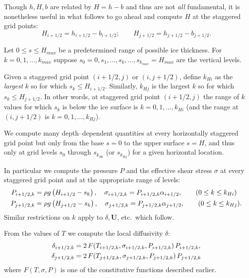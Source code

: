 \documentclass[12pt,final]{amsart}%
\theoremstyle{plain}
\theoremstyle{definition}
\theoremstyle{remark}
\newcommand{\bU}{{\mathbf{U}}}
\begin{document}
Though $h,H,b$ are related by $H=h-b$ and thus are not \emph{all} fundamental, it is nonetheless useful in what follows to go ahead and compute $H$ at the staggered grid points:
\begin{equation}
    H_{i+1/2}=h_{i+1/2}-b_{i+1/2}; \qquad H_{j+1/2}=h_{j+1/2}-b_{j+1/2}.
\end{equation}

Let $0\le s \le H_{max}$ be a predetermined range of possible ice thickness.  For $k=0,1,\dots,k_{max}$ suppose $s_0=0,s_1 ,\dots,s_k,\dots,s_{k_{max}}=H_{max}$ are the vertical levels.

Given a staggered grid point $(i+1/2,j)$ or $(i,j+1/2)$, define $k_{Hi}$ as the \emph{largest} $k$ so for which $s_k\le H_{i+1/2}$.  Similarly, $k_{Hj}$ is the largest $k$ so for which $s_k\le H_{j+1/2}$.  In other words, at staggered grid point $(i+1/2,j)$ the range of $k$ values for which $s_k$ is below the ice surface is $k=0,1,\dots,k_{Hi}$ (and the range at $(i,j+1/2)$ is $k=0,1,\dots,k_{Hj}$).

We compute many depth--dependent quantities at every horizontally staggered grid point but only from the base $s=0$ to the upper surface $s=H$, and thus only at grid levels $s_0$ through $s_{k_{Hi}}$ (or $s_{k_{Hj}}$) for a given horizontal location.

In particular we compute the pressure $P$ and the effective shear stress $\sigma$ at every staggered grid point and at the appropriate range of levels:
\begin{align}
  P_{i+1/2,k}&=\rho g \left(H_{i+1/2}-s_k\right), \quad \sigma_{i+1/2,k}=P_{i+1/2,k} \alpha_{i+1/2}, \qquad (0\le k \le k_{Hi}) \\
  P_{j+1/2,k}&=\rho g \left(H_{j+1/2}-s_k\right), \quad \sigma_{j+1/2,k}=P_{j+1/2,k} \alpha_{j+1/2}, \qquad (0\le k \le k_{Hj}).\notag
\end{align}
Similar restrictions on $k$ apply to $\delta,\bU$, etc.~which follow.

From the values of $T$ we compute the local diffusivity $\delta$:
\begin{align}
\delta_{i+1/2,k}&=2 \,F(T_{i+1/2,k},\sigma_{i+1/2,k},P_{i+1/2,k})\,P_{i+1/2,k}, \\
\delta_{j+1/2,k}&=2 \,F(T_{j+1/2,k},\sigma_{j+1/2,k},P_{j+1/2,k})\,P_{j+1/2,k}\notag
\end{align}
where $F(T,\sigma,P)$ is one of the constitutive functions described earlier.
\end{document}
